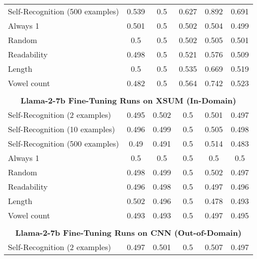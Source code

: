 \begin{table}[h]
\begin{tabular}{l|ccccc}
    Self-Recognition (500 examples)            & 0.539      & 0.5        & 0.627      & 0.892      & 0.691      \\
    Always 1                           & 0.501      & 0.5        & 0.502      & 0.504      & 0.499      \\
    Random                             & 0.5        & 0.5        & 0.502      & 0.505      & 0.501      \\
    Readability                        & 0.498      & 0.5        & 0.521      & 0.576      & 0.509      \\
    Length                             & 0.5        & 0.5        & 0.535      & 0.669      & 0.519      \\
    Vowel count                        & 0.482      & 0.5        & 0.564      & 0.742      & 0.523      \\
    \multicolumn{6}{c}{} \\
    \multicolumn{6}{c}{\textbf{Llama-2-7b Fine-Tuning Runs on XSUM (In-Domain)}} \\
    Self-Recognition (2 examples)              & 0.495      & 0.502      & 0.5        & 0.501      & 0.497      \\
    Self-Recognition (10 examples)             & 0.496      & 0.499      & 0.5        & 0.505      & 0.498      \\
    Self-Recognition (500 examples)            & 0.49       & 0.491      & 0.5        & 0.514      & 0.483      \\
    Always 1                           & 0.5        & 0.5        & 0.5        & 0.5        & 0.5        \\
    Random                             & 0.498      & 0.499      & 0.5        & 0.502      & 0.497      \\
    Readability                        & 0.496      & 0.498      & 0.5        & 0.497      & 0.496      \\
    Length                             & 0.502      & 0.496      & 0.5        & 0.478      & 0.493      \\
    Vowel count                        & 0.493      & 0.493      & 0.5        & 0.497      & 0.495      \\
    \multicolumn{6}{c}{} \\
    \multicolumn{6}{c}{\textbf{Llama-2-7b Fine-Tuning Runs on CNN (Out-of-Domain)}} \\
    Self-Recognition (2 examples)              & 0.497      & 0.501      & 0.5        & 0.507      & 0.497      \\

\end{tabular}
\end{table}
